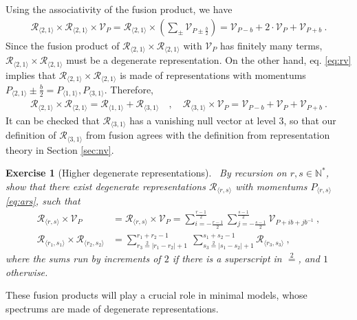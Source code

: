 \documentclass[12pt, a4paper]{article}
\theoremstyle{break}
\newtheorem{exo}{Exercise}[section]
\begin{document}
Using the associativity of the fusion product, we have 
\begin{align}
 \mathcal{R}_{\langle 2,1\rangle}\times \mathcal{R}_{\langle 2,1\rangle}  \times \mathcal V_P  =
\mathcal{R}_{\langle 2,1\rangle}\times  \left(\sum_\pm \mathcal V_{P\pm \frac{b}{2}}\right) =
\mathcal V_{P - b} + 2\cdot \mathcal V_P + \mathcal V_{P + b} \ .
\end{align}
Since the fusion product of $\mathcal{R}_{\langle 2,1\rangle}\times \mathcal{R}_{\langle 2,1\rangle} $ with $\mathcal V_P$ has finitely many terms, $\mathcal{R}_{\langle 2,1\rangle}\times \mathcal{R}_{\langle 2,1\rangle} $
must be a degenerate representation. 
On the other hand, eq. \eqref{eq:rv} implies that $\mathcal{R}_{\langle 2,1\rangle}\times \mathcal{R}_{\langle 2,1\rangle} $ is made of representations with momentums $P_{\langle 2,1\rangle} \pm \frac{b}{2} = P_{\langle 1,1\rangle}, P_{\langle 3,1\rangle}$. Therefore,
\begin{align}
 \mathcal{R}_{\langle 2,1\rangle}\times \mathcal{R}_{\langle 2,1\rangle} = \mathcal{R}_{\langle 1,1\rangle} + \mathcal{R}_{\langle 3,1\rangle} \quad , \quad \mathcal{R}_{\langle 3,1\rangle} \times \mathcal V_P = \mathcal V_{P - b} + \mathcal V_P + \mathcal V_{P + b}\ .
\end{align}
It can be checked that $\mathcal{R}_{\langle 3,1\rangle}$ has a vanishing null vector at level $3$, so that our definition of $\mathcal{R}_{\langle 3,1\rangle}$ from fusion agrees with the definition from representation theory in Section \ref{sec:nv}.

\begin{exo}[Higher degenerate representations]
~\label{exo:hdr}
 By recursion on $r,s\in \mathbb{N}^*$, show that there exist degenerate representations $\mathcal{R}_{\langle r,s \rangle}$ with momentums $P_{\langle r,s \rangle}$ \eqref{eq:ars},
such that 
 \begin{align}
 \mathcal{R}_{\langle r,s \rangle}\times \mathcal{V}_P &= \mathcal{R}_{\langle r,s \rangle}\times \mathcal{V}_P = \sum_{i=-\frac{r-1}{2}}^{\frac{r-1}{2}} \sum_{j=-\frac{s-1}{2}}^{\frac{s-1}{2}} \mathcal{V}_{P + ib+jb^{-1}}\ ,
\label{rtv}
 \\
 \mathcal{R}_{\langle r_1,s_1 \rangle} \times \mathcal{R}_{\langle r_2,s_2 \rangle} &= \sum_{r_3\overset{2}{=}|r_1-r_2|+1}^{r_1+r_2-1}\ \sum_{s_3\overset{2}{=}|s_1-s_2|+1}^{s_1+s_2-1} \mathcal{R}_{\langle r_3,s_3 \rangle}\ ,
\label{rrsr}
\end{align}
where the sums run by increments of $2$ if there is a superscript in $\overset{2}{=}$, and $1$ otherwise.
\end{exo}
These fusion products will play a crucial role in minimal models, whose spectrums are made of degenerate representations. 
\end{document}
